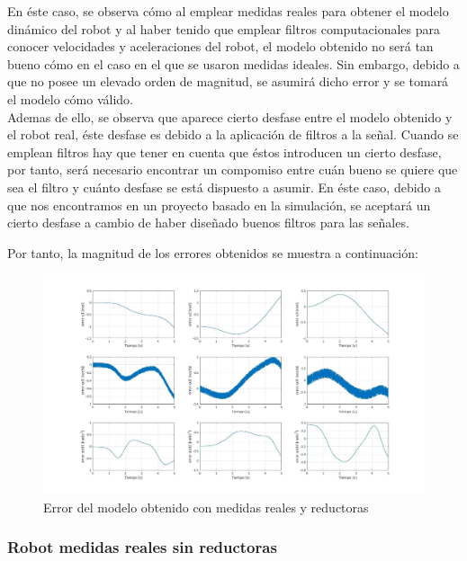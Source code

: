 En éste caso, se observa cómo al emplear medidas reales para obtener el modelo dinámico del robot y al haber tenido que emplear filtros computacionales para conocer velocidades y aceleraciones del robot, el modelo obtenido no será tan bueno cómo en el caso en el que se usaron medidas ideales. Sin embargo, debido a que no posee un elevado orden de magnitud, se asumirá dicho error y se tomará el modelo cómo válido.\\
Ademas de ello, se observa que aparece cierto desfase entre el modelo obtenido y el robot real, éste desfase es debido a la aplicación de filtros a la señal. Cuando se emplean filtros hay que tener en cuenta que éstos introducen un cierto desfase, por tanto, será necesario encontrar un compomiso entre cuán bueno se quiere que sea el filtro y cuánto desfase se está dispuesto a asumir. En éste caso, debido a que nos encontramos en un proyecto basado en la simulación, se aceptará un cierto desfase a cambio de haber diseñado buenos filtros para las señales.

\newpage
Por tanto, la magnitud de los errores obtenidos se muestra a continuación:

\begin{figure}[h!]
	\centering
	\includegraphics[width=1\textwidth]{EstimacParam_SisModError_In1_RealCR}
	\caption{Error del modelo obtenido con medidas reales y reductoras}
\end{figure}

\subsubsection{Robot medidas reales sin reductoras}
